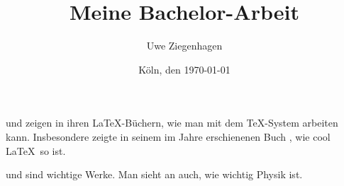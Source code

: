 \documentclass[12pt,ngerman,oneside,parskip=half,DIV=12]{scrbook}
\author{Uwe Ziegenhagen}
\title{Meine Bachelor-Arbeit}
\date{Köln, den \today}
\begin{document}
\maketitle

\tableofcontents

\listoffigures

\listoftables



\cite{knuth} und \cite{Voss2017} zeigen in ihren \LaTeX-Büchern, wie man mit dem \TeX-System arbeiten kann. Insbesondere \citeauthor{Voss2017} zeigte in seinem im Jahre \citeyear{Voss2017} erschienenen Buch , wie cool \LaTeX\ so ist.

\blindtext \cite{Voss2017} und \cite{knuth} sind wichtige Werke. Man sieht an \cite{Aybas2021} auch, wie wichtig Physik ist.

\cite{hist} 




\printbibliography[title={Wiss. Artikel},type=article]

\printbibliography[title={Bücher},type=book]

\printbibliography[title={Internet},type=online]
\end{document}
